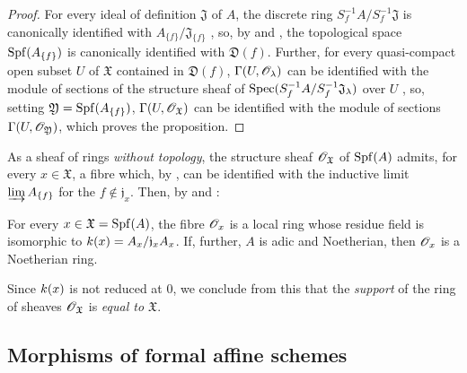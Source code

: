 \begin{proof}
\label{proof-1.10.1.4}
For every ideal of definition $\mathfrak{J}$ of $A$, the discrete ring $S_f^{-1}A/ S_f^{-1}\mathfrak{J}$ is canonically identified with $A_{\{f\}}/\mathfrak{J}_{\{f\}}$ , so, by  and , the topological space $\operatorname{Spf}(A_{\{f\}})$ is canonically identified with $\mathfrak{D}(f)$.
Further, for every quasi-compact open subset $U$ of $\mathfrak{X}$ contained in $\mathfrak{D}(f)$, $\Gamma(U,\mathscr{O}_\lambda)$ can be identified with the module of sections of the structure sheaf of $\operatorname{Spec}(S_f^{-1}A/ S_f^{-1}\mathfrak{J}_\lambda)$ over $U$ , so, setting $\mathfrak{Y}=\operatorname{Spf}(A_{\{f\}})$, $\Gamma(U,\mathscr{O}_\mathfrak{X})$ can be identified with the module of sections $\Gamma(U,\mathscr{O}_\mathfrak{Y})$, which proves the proposition.
\end{proof}

\begin{env}[10.1.5]
\label{1.10.1.5}
As a sheaf of rings \emph{without topology}, the structure sheaf $\mathscr{O}_\mathfrak{X}$ of $\operatorname{Spf}(A)$ admits, for every $x\in\mathfrak{X}$, a fibre which, by , can be identified with the inductive limit $\varinjlim A_{\{f\}}$ for the $f\not\in\mathfrak{j}_x$.
Then, by  and :
\end{env}

\begin{proposition}[10.1.6]
\label{1.10.1.6}
For every $x\in\mathfrak{X}=\operatorname{Spf}(A)$, the fibre $\mathscr{O}_x$ is a local ring whose residue field is isomorphic to $k(x)=A_x/\mathfrak{j}_xA_x$.
If, further, $A$ is adic and Noetherian, then $\mathscr{O}_x$ is a Noetherian ring.
\end{proposition}

Since $k(x)$ is not reduced at $0$, we conclude from this that the \emph{support} of the ring of sheaves $\mathscr{O}_\mathfrak{X}$ is \emph{equal to $\mathfrak{X}$}.

\subsection{Morphisms of formal affine schemes}
\label{subsection:1.10.2}

